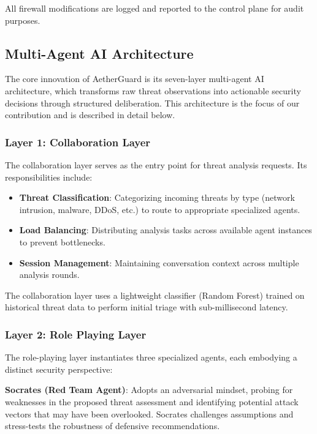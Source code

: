 All firewall modifications are logged and reported to the control plane for audit purposes.

\subsection{Multi-Agent AI Architecture}
\label{subsec:ai-architecture}

The core innovation of AetherGuard is its seven-layer multi-agent AI architecture, which transforms raw threat observations into actionable security decisions through structured deliberation. This architecture is the focus of our contribution and is described in detail below.

\subsubsection{Layer 1: Collaboration Layer}
\label{subsubsec:layer1}

The collaboration layer serves as the entry point for threat analysis requests. Its responsibilities include:

\begin{itemize}
    \item \textbf{Threat Classification}: Categorizing incoming threats by type (network intrusion, malware, DDoS, etc.) to route to appropriate specialized agents.
    \item \textbf{Load Balancing}: Distributing analysis tasks across available agent instances to prevent bottlenecks.
    \item \textbf{Session Management}: Maintaining conversation context across multiple analysis rounds.
\end{itemize}

The collaboration layer uses a lightweight classifier (Random Forest) trained on historical threat data to perform initial triage with sub-millisecond latency.

\subsubsection{Layer 2: Role Playing Layer}
\label{subsubsec:layer2}

The role-playing layer instantiates three specialized agents, each embodying a distinct security perspective:

\textbf{Socrates (Red Team Agent)}: Adopts an adversarial mindset, probing for weaknesses in the proposed threat assessment and identifying potential attack vectors that may have been overlooked. Socrates challenges assumptions and stress-tests the robustness of defensive recommendations.

